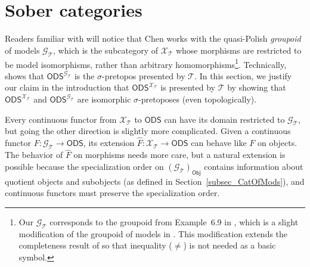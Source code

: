 \documentclass{article}
\theoremstyle{plain}
\def\cal#1{{\mathcal #1}}
\def\calG{{\cal G}}
\def\calT{{\cal T}}
\def\calX{{\cal X}}
\newcommand{\ODS}{{\mathsf{ODS}}}
\newcommand{\Obj}{\mathsf{Obj}}
\begin{document}
\section{Sober categories}


Readers familiar with \cite{Chen19} will notice that Chen works with the quasi-Polish \emph{groupoid} of models $\calG_\calT$, which is the subcategory of $\calX_\calT$ whose morphisms are restricted to be model isomorphisms, rather than arbitrary homomorphisms\footnote{Our $\calG_\calT$ corresponds to the groupoid from Example~6.9 in \cite{Chen25}, which is a slight modification of the groupoid of models in \cite{Chen19}. This modification extends the completeness result of \cite{Chen19} so that inequality ($\not=$) is not needed as a basic symbol.}. Technically, \cite{Chen19} shows that $\ODS^{\calG_\calT}$ is the $\sigma$-pretopos presented by $\calT$. In this section, we justify our claim in the introduction that $\ODS^{\calX_\calT}$ is presented by $\calT$ by showing that $\ODS^{\calX_\calT}$ and $\ODS^{\calG_\calT}$ are isomorphic $\sigma$-pretoposes (even topologically). 

Every continuous functor from $\calX_\calT$ to $\ODS$ can have its domain restricted to $\calG_\calT$, but going the other direction is slightly more complicated. Given a continuous functor $F\colon \calG_\calT \to \ODS$, its extension $\hat{F}\colon \calX_\calT \to \ODS$ can behave like $F$ on objects. The behavior of $\hat{F}$ on morphisms needs more care, but a natural extension is possible because the specialization order on $(\calG_\calT)_\Obj$ contains information about quotient objects and subobjects (as defined in Section~\ref{subsec_CatOfMods}), and continuous functors must preserve the specialization order. 
\end{document}

